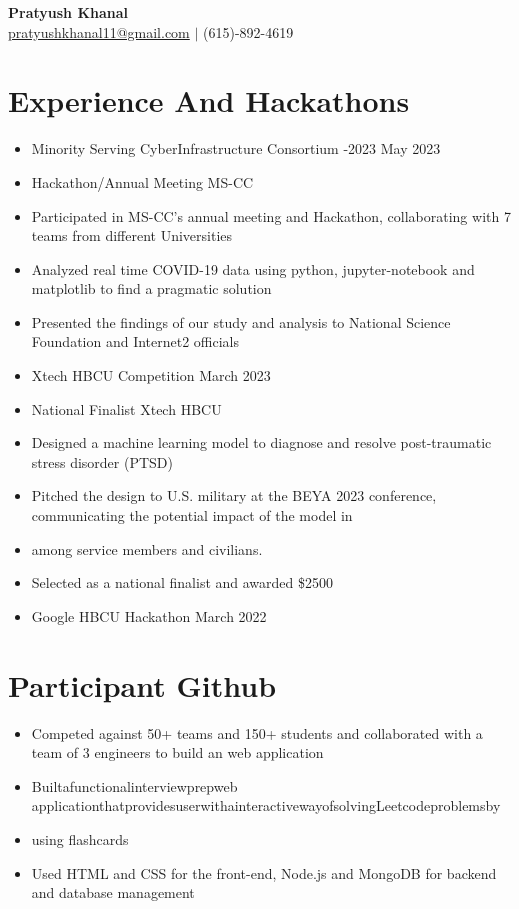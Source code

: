 \documentclass[letterpaper,10pt]{article}
\begin{document}
\begin{center}
  {\LARGE\bfseries\color{accent} Pratyush Khanal} \\[4pt]
  \small
  \href{mailto:pratyushkhanal11@gmail.com}{pratyushkhanal11@gmail.com}   $|$ (615)-892-4619      \end{center}





\section{Experience And Hackathons}
\begin{itemize}
  \item Minority Serving CyberInfrastructure Consortium -2023 May 2023
  \item Hackathon/Annual Meeting MS-CC
  \item Participated in MS-CC’s annual meeting and Hackathon, collaborating with 7 teams from different Universities
  \item Analyzed real time COVID-19 data using python, jupyter-notebook and matplotlib to find a pragmatic solution
  \item Presented the findings of our study and analysis to National Science Foundation and Internet2 officials
  \item Xtech HBCU Competition March 2023
  \item National Finalist Xtech HBCU
  \item Designed a machine learning model to diagnose and resolve post-traumatic stress disorder (PTSD)
  \item Pitched the design to U.S. military at the BEYA 2023 conference, communicating the potential impact of the model in
  \item among service members and civilians.
  \item Selected as a national finalist and awarded \$2500
  \item Google HBCU Hackathon March 2022
\end{itemize}





\section{Participant Github}
\begin{itemize}
  \item Competed against 50+ teams and 150+ students and collaborated with a team of 3 engineers to build an web application
  \item Builtafunctionalinterviewprepweb applicationthatprovidesuserwithainteractivewayofsolvingLeetcodeproblemsby
  \item using flashcards
  \item Used HTML and CSS for the front-end, Node.js and MongoDB for backend and database management
\end{itemize}
\end{document}
